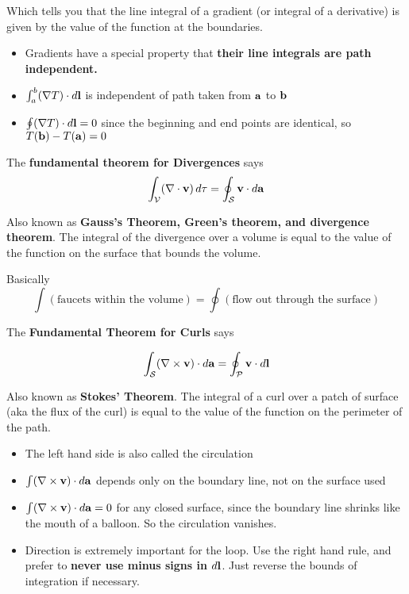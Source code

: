 \documentclass{article}
\begin{document}
Which tells you that the line integral of a gradient (or integral of a derivative) is given by the value of the function at the boundaries.
\begin{itemize}
    \item Gradients have a special property that \textbf{their line integrals are path independent.}
    \item $\int_a^b(\nabla T)\cdot d\vb{l}$ is independent of path taken from $\vb{a}$ to $\vb{b}$
    \item $\oint (\nabla T)\cdot d\vb{l} = 0$ since the beginning and end points are identical, so $T(\vb{b}) - T(\vb{a}) = 0$
\end{itemize}


The \textbf{fundamental theorem for Divergences} says
$$
\int_{\mathcal{V}} (\nabla \cdot \vb{v} )\, d\tau = \oint_{\mathcal{S}} \vb{v} \cdot d\vb{a}
$$

Also known as \textbf{Gauss's Theorem, Green's theorem, and divergence theorem}.  The integral of the divergence over a volume is equal to the value of the function on the surface that bounds the volume.

Basically
$$
\int (\text{faucets within the volume}) = \oint (\text{flow out through the surface})
$$

The \textbf{Fundamental Theorem for Curls} says

$$
\int_{\mathcal{S}}(\nabla \times \vb{v}) \cdot d\vb{a} = \oint_{\mathcal{P}} \vb{v} \cdot d\vb{l}
$$

Also known as \textbf{Stokes' Theorem}.  The integral of a curl over a patch of surface (aka the flux of the curl) is equal to the value of the function on the perimeter of the path.

\begin{itemize}
    \item The left hand side is also called the circulation
    \item $\int(\nabla \times \vb{v}) \cdot d\vb{a}$ depends only on the boundary line, not on the surface used
    \item $\int(\nabla \times \vb{v}) \cdot d\vb{a} = 0$  for any closed surface, since the boundary line shrinks like the mouth of a balloon.  So the circulation vanishes.
    \item Direction is extremely important for the loop.  Use the right hand rule, and prefer to \textbf{never use minus signs in $d\vb{l}$}.  Just reverse the bounds of integration if necessary.
\end{itemize}
\end{document}
